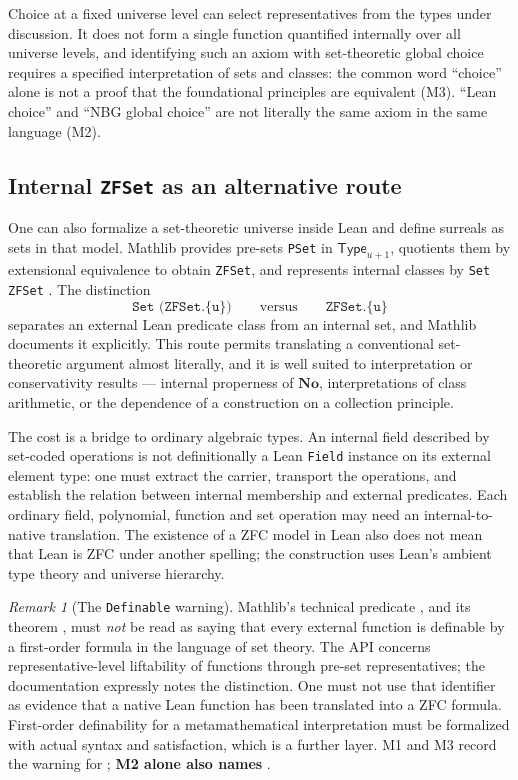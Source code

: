 \documentclass[11pt,letterpaper]{article}
\numberwithin{equation}{section}
\theoremstyle{definition}
\theoremstyle{remark}
\newtheorem{remark}[theorem]{Remark}
\newcommand{\No}{\mathbf{No}}
\newcommand{\Type}{\mathsf{Type}}
\begin{document}
Choice at a fixed universe level can select representatives from the types under
discussion. It does not form a single function quantified internally over all
universe levels, and identifying such an axiom with set-theoretic global choice
requires a specified interpretation of sets and classes: the common word
``choice'' alone is not a proof that the foundational principles are equivalent
(M3). ``Lean choice'' and ``NBG global choice'' are not literally the same axiom
in the same language (M2).

\subsection{Internal \texttt{ZFSet} as an alternative route}
\label{found:sub:zfset}
One can also formalize a set-theoretic universe inside Lean and define surreals
as sets in that model. Mathlib provides pre-sets \texttt{PSet} in
$\Type_{u+1}$, quotients them by extensional equivalence to obtain
\texttt{ZFSet}, and represents internal classes by \texttt{Set ZFSet}
\cite{found:MathlibPSet,found:MathlibZFBasic,found:MathlibClass}. The
distinction
\[
 \texttt{Set (ZFSet.\{u\})}\qquad\text{versus}\qquad \texttt{ZFSet.\{u\}}
\]
separates an external Lean predicate class from an internal set, and Mathlib
documents it explicitly. This route permits translating a conventional
set-theoretic argument almost literally, and it is well suited to interpretation
or conservativity results --- internal properness of $\No$, interpretations of
class arithmetic, or the dependence of a construction on a collection principle.

The cost is a bridge to ordinary algebraic types. An internal field described by
set-coded operations is not definitionally a Lean \texttt{Field} instance on its
external element type: one must extract the carrier, transport the operations,
and establish the relation between internal membership and external predicates.
Each ordinary field, polynomial, function and set operation may need an
internal-to-native translation. The existence of a ZFC model in Lean also does
not mean that Lean is ZFC under another spelling; the construction uses Lean's
ambient type theory and universe hierarchy.

\begin{remark}[The \texttt{Definable} warning]\label{found:rem:definable}
Mathlib's technical predicate , and its theorem
, must \emph{not} be read as saying that
every external function is definable by a first-order formula in the language of
set theory. The API concerns representative-level liftability of functions
through pre-set representatives; the documentation expressly notes the
distinction. One must not use that identifier as evidence that a native Lean
function has been translated into a ZFC formula. First-order definability for a
metamathematical interpretation must be formalized with actual syntax and
satisfaction, which is a further layer. M1 and M3 record the warning for
; \textbf{M2 alone also names
}.
\end{remark}
\end{document}
